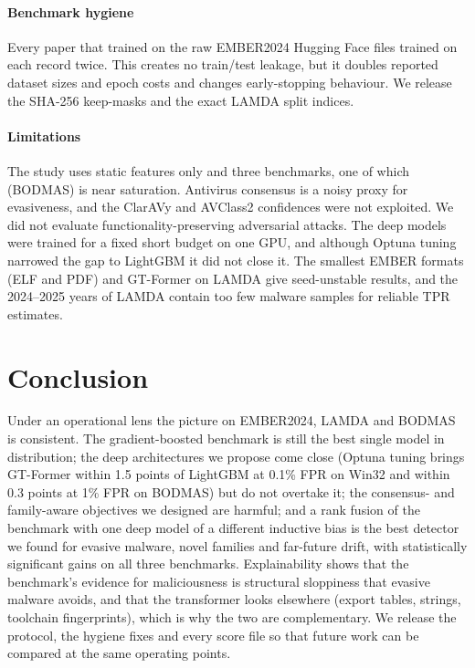 \documentclass[fleqn,10pt]{wlscirep}
\newcommand{\gtf}{GT\mbox{-}Former}
\newcommand{\lgbm}{LightGBM}
\begin{document}
\paragraph{Benchmark hygiene}
Every paper that trained on the raw EMBER2024 Hugging Face files trained on each record twice. This creates no train/test leakage, but it doubles reported dataset sizes and epoch costs and changes early-stopping behaviour. We release the SHA-256 keep-masks and the exact LAMDA split indices.

\paragraph{Limitations}
The study uses static features only and three benchmarks, one of which (BODMAS) is near saturation. Antivirus consensus is a noisy proxy for evasiveness, and the ClarAVy and AVClass2 confidences were not exploited. We did not evaluate functionality-preserving adversarial attacks. The deep models were trained for a fixed short budget on one GPU, and although Optuna tuning narrowed the gap to \lgbm{} it did not close it. The smallest EMBER formats (ELF and PDF) and \gtf{} on LAMDA give seed-unstable results, and the 2024--2025 years of LAMDA contain too few malware samples for reliable TPR estimates.

\section{Conclusion}
\label{sec:conclusion}

Under an operational lens the picture on EMBER2024, LAMDA and BODMAS is consistent. The gradient-boosted benchmark is still the best single model in distribution; the deep architectures we propose come close (Optuna tuning brings \gtf{} within 1.5 points of \lgbm{} at 0.1\% FPR on Win32 and within 0.3 points at 1\% FPR on BODMAS) but do not overtake it; the consensus- and family-aware objectives we designed are harmful; and a rank fusion of the benchmark with one deep model of a different inductive bias is the best detector we found for evasive malware, novel families and far-future drift, with statistically significant gains on all three benchmarks. Explainability shows that the benchmark's evidence for maliciousness is structural sloppiness that evasive malware avoids, and that the transformer looks elsewhere (export tables, strings, toolchain fingerprints), which is why the two are complementary. We release the protocol, the hygiene fixes and every score file so that future work can be compared at the same operating points.
\end{document}
